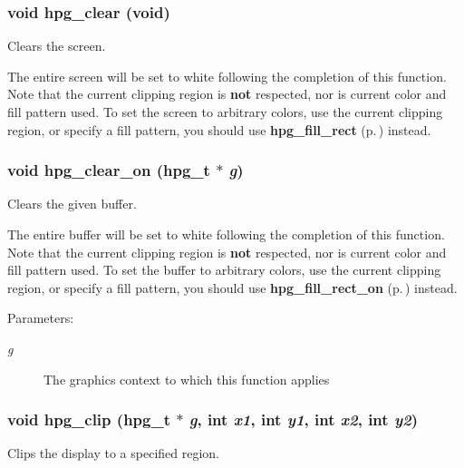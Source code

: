 \subsubsection{\setlength{\rightskip}{0pt plus 5cm}void hpg\_\-clear (void)}\label{hpgraphics_8h_a39}


Clears the screen.

The entire screen will be set to white following the completion of this function. Note that the current clipping region is {\bf not} respected, nor is current color and fill pattern used. To set the screen to arbitrary colors, use the current clipping region, or specify a fill pattern, you should use {\bf hpg\_\-fill\_\-rect} {\rm (p.\,\pageref{hpgraphics_8h_a47})} instead. 
\subsubsection{\setlength{\rightskip}{0pt plus 5cm}void hpg\_\-clear\_\-on ({\bf hpg\_\-t} $\ast$ {\em g})}\label{hpgraphics_8h_a38}


Clears the given buffer.

The entire buffer will be set to white following the completion of this function. Note that the current clipping region is {\bf not} respected, nor is current color and fill pattern used. To set the buffer to arbitrary colors, use the current clipping region, or specify a fill pattern, you should use {\bf hpg\_\-fill\_\-rect\_\-on} {\rm (p.\,\pageref{hpgraphics_8h_a46})} instead.\begin{Desc}
\item[Parameters: ]\par
\begin{description}
\item[{\em 
g}]The graphics context to which this function applies \end{description}
\end{Desc}
\subsubsection{\setlength{\rightskip}{0pt plus 5cm}void hpg\_\-clip ({\bf hpg\_\-t} $\ast$ {\em g}, int {\em x1}, int {\em y1}, int {\em x2}, int {\em y2})}\label{hpgraphics_8h_a37}


Clips the display to a specified region.

